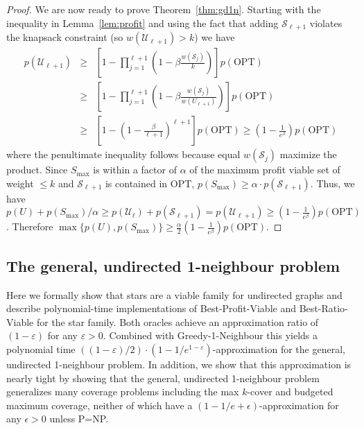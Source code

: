 \documentclass[12pt]{article}
\newcommand{\OPT}{\ensuremath{\mathrm{OPT}\xspace}}
\begin{document}
\begin{proof}
We are now ready to prove Theorem~\ref{thm:gd1n}.  Starting with the inequality in Lemma~\ref{lem:profit} and using
the fact that adding $\mathcal{S}_{\ell+1}$ violates the knapsack constraint (so
$w(\mathcal{U}_{\ell+1}) > k$) we have
\begin{eqnarray*}
p(\mathcal{U}_{\ell+1}) & \geq & \left[1-\prod_{j = 1}^{\ell + 1}
\left(1-\beta\frac{w(\mathcal{S}_j)}{k} \right) \right] p(\OPT) \\
& \geq &\left[1-\prod_{j = 1}^{\ell + 1}
\left(1-\beta\frac{w(\mathcal{S}_j)}{w(U_{\ell+1})} \right) \right]
p(\OPT) \\
& \geq & \left[1-\left(1-\frac{\beta}{\ell+1}\right)^{\ell+1} \right]
p(\OPT) \geq  \left(1-\frac{1}{e^\beta}\right)p(\OPT)
\end{eqnarray*}
where the penultimate inequality follows because equal $w(\mathcal{S}_j)$ maximize the product.  Since $S_{\max}$ is within a factor of $\alpha$ of the maximum profit viable set of weight $\leq k$ and $\mathcal{S}_{\ell+1}$ is contained in \OPT,
$p(S_{\max}) \geq \alpha \cdot p(\mathcal{S}_{\ell+1})$.  Thus, we have $p(U) + p(S_{\max})/ \alpha \geq p(\mathcal{U}_\ell)
+ p(\mathcal{S}_{\ell+1}) = p(\mathcal{U}_{\ell+1}) \geq
\left(1-\frac{1}{e^\beta}\right)p(\OPT)$.  Therefore
$\max\{p(U), p(S_{\max})\} \geq
\frac{\alpha}{2}\left(1-\frac{1}{e^\beta}\right)p(\OPT)$.

\hfill
\end{proof}













\subsection{The general, undirected 1-neighbour problem} \label{sec:gu1n}

Here we formally show that stars are a viable family for undirected
graphs and describe polynomial-time implementations of {\sc
Best-Profit-Viable} and {\sc Best-Ratio-Viable} for the star family.  Both oracles achieve an approximation ratio of $(1-\varepsilon)$ for any $\varepsilon > 0$.  Combined with {\sc Greedy-1-Neighbour} this yields a polynomial time $((1-\varepsilon)/2) \cdot (1-1/e^{1-\varepsilon})$-approximation for the general, undirected 1-neighbour problem.  In addition, we show that this approximation is nearly tight by showing that the general, undirected 1-neighbour problem generalizes many coverage problems including the max $k$-cover and budgeted maximum coverage, neither of which have a $(1-1/e+\epsilon)$-approximation for any $\epsilon > 0$ unless P=NP.
\end{document}
